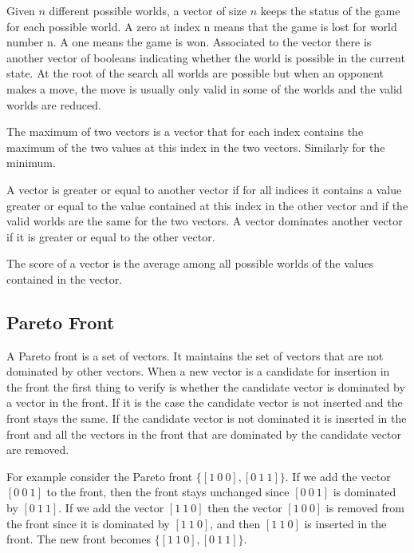 \documentclass{ecai}
\begin{document}
Given $n$ different possible worlds, a vector of size $n$ keeps the
status of the game for each possible world. A zero at index n means
that the game is lost for world number n. A one means the game is
won. Associated to the vector there is another vector of booleans
indicating whether the world is possible in the current state. At the
root of the search all worlds are possible but when an opponent makes
a move, the move is usually only valid in some of the worlds and the
valid worlds are reduced.


The maximum of two vectors is a vector that for each index contains
the maximum of the two values at this index in the two
vectors. Similarly for the minimum.

A vector is greater or equal to another vector if for all indices it
contains a value greater or equal to the value contained at this index
in the other vector and if the valid worlds are the same for the two
vectors. A vector dominates another vector if it is greater or equal
to the other vector.

The score of a vector is the average among all possible worlds of the
values contained in the vector.

\subsection{Pareto Front}

A Pareto front is a set of vectors. It maintains the set of vectors
that are not dominated by other vectors. When a new vector is a
candidate for insertion in the front the first thing to verify is
whether the candidate vector is dominated by a vector in the front. If
it is the case the candidate vector is not inserted and the front
stays the same. If the candidate vector is not dominated it is
inserted in the front and all the vectors in the front that are
dominated by the candidate vector are removed.

For example consider the Pareto front $\{[1~0~0],[0~1~1]\}$. If we add
the vector $[0~0~1]$ to the front, then the front stays unchanged
since $[0~0~1]$ is dominated by $[0~1~1]$. If we add the vector
$[1~1~0]$ then the vector $[1~0~0]$ is removed from the front since it
is dominated by $[1~1~0]$, and then $[1~1~0]$ is inserted in the
front. The new front becomes $\{[1~1~0],[0~1~1]\}$.
\end{document}
